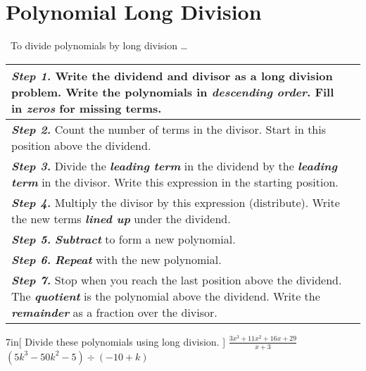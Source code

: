 \section{Polynomial Long Division}
\begin{myConcept}{~To divide polynomials by long division \dots}
    \begin{center}
        \begin{tabular}{m{}|p{}}
            {\bfseries\itshape Step 1.}
            Write the dividend and divisor
            as a long division problem.
            Write the polynomials in {\bfseries\itshape descending order}.
            Fill in {\bfseries\itshape zeros} for missing terms. 
            & 
            \rule{0in}{1\baselineskip}
            \\ \hline
            {\bfseries\itshape Step 2.}
            Count the number of terms in the divisor.
            Start in this position above the dividend.
            & 
            \rule{0in}{3\baselineskip}
            \\ \hline
            {\bfseries\itshape Step 3.}
            Divide the {\bfseries\itshape leading term} in the dividend 
            by the {\bfseries\itshape leading term} in the divisor.
            Write this expression in the starting position.
            & 
            \rule{0in}{4\baselineskip}
            \\ \hline
            {\bfseries\itshape Step 4.}
            Multiply the divisor by this expression (distribute).
            Write the new terms {\bfseries\itshape lined up} under the dividend.
            & 
            \rule{0in}{4\baselineskip}
            \\ \hline
            {\bfseries\itshape Step 5.}
            {\bfseries\itshape Subtract} to form a new polynomial.
            & 
            \rule{0in}{7\baselineskip}
            \\ \hline
            {\bfseries\itshape Step 6.}
            {\bfseries\itshape Repeat} with the new polynomial.
            & 
            \rule{0in}{11.5\baselineskip}
            \\ \hline
            {\bfseries\itshape Step 7.}
            Stop when you reach the last position above the dividend.
            The {\bfseries\itshape quotient} is the polynomial above the dividend.
            Write the {\bfseries\itshape remainder} as a fraction over the divisor.
            & 
            \\ 
        \end{tabular}
    \end{center}
\end{myConcept}


\begin{my2Problems}[\large]{7in}[
    Divide these polynomials using long division.
    ]
    {
        $\frac
            {3x^3 + 11x^2 + 16x + 29} 
            {x+3}
        $
    }
    {
        $
            (5k^3 - 50k^2 -5) 
            \div
            (-10 + k)
        $
    }
\end{my2Problems}




